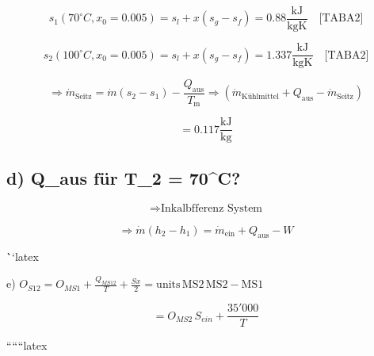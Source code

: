 \[
s_1 (70^\circ C, x_0 = 0.005) = s_{l} + x (s_{g} - s_{f}) = 0.88 \frac{\text{kJ}}{\text{kgK}} \quad \text{[TABA2]}
\]

\[
s_2 (100^\circ C, x_0 = 0.005) = s_{l} + x (s_{g} - s_{f}) = 1.337 \frac{\text{kJ}}{\text{kgK}} \quad \text{[TABA2]}
\]

\[
\Rightarrow \dot{m}_{\text{Seitz}} = \dot{m} (s_2 - s_1) - \frac{Q_{\text{aus}}}{T_{\text{m}}} \Rightarrow \left( \dot{m}_{\text{Kühlmittel}} + Q_{\text{aus}} - \dot{m}_{\text{Seitz}} \right)
\]

\[
= 0.117 \frac{\text{kJ}}{\text{kg}}
\]

\subsection*{d) Q\_aus für T_2 = 70^\circ C?}

\[
\Rightarrow \text{Inkalbfferenz System}
\]

\[
\Rightarrow \dot{m} (h_2 - h_1) = \dot{m}_{\text{ein}} + Q_{\text{aus}} - W
\]

\```latex


e) \( O_{S12} = O_{MS1} + \frac{Q_{MS12}}{T} + \frac{Sx}{2} = \text{units} \, \text{MS2} \, \text{MS2} - \text{MS1} \)

\[ = O_{MS2} \, S_{ein} + \frac{35'000}{T} \]

``````latex


